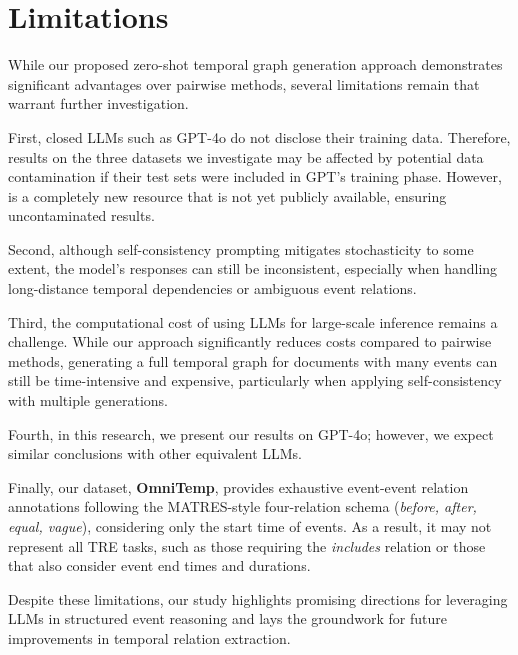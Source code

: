 \section*{Limitations}

While our proposed zero-shot temporal graph generation approach demonstrates significant advantages over pairwise methods, several limitations remain that warrant further investigation.

First, closed LLMs such as GPT-4o do not disclose their training data. Therefore, results on the three datasets we investigate may be affected by potential data contamination if their test sets were included in GPT's training phase. However, \App{} is a completely new resource that is not yet publicly available, ensuring uncontaminated results.

Second, although self-consistency prompting mitigates stochasticity to some extent, the model’s responses can still be inconsistent, especially when handling long-distance temporal dependencies or ambiguous event relations.

Third, the computational cost of using LLMs for large-scale inference remains a challenge. While our approach significantly reduces costs compared to pairwise methods, generating a full temporal graph for documents with many events can still be time-intensive and expensive, particularly when applying self-consistency with multiple generations.

Fourth, in this research, we present our results on GPT-4o; however, we expect similar conclusions with other equivalent LLMs.

Finally, our dataset, \textbf{OmniTemp}, provides exhaustive event-event relation annotations following the MATRES-style four-relation schema (\textit{before, after, equal, vague}), considering only the start time of events. As a result, it may not represent all TRE tasks, such as those requiring the \textit{includes} relation or those that also consider event end times and durations.

Despite these limitations, our study highlights promising directions for leveraging LLMs in structured event reasoning and lays the groundwork for future improvements in temporal relation extraction.

